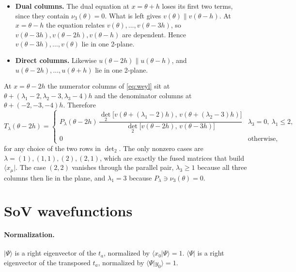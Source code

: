 \documentclass[11pt]{article}
\newcommand{\ket}[1]{|#1\rangle}
\newcommand{\bra}[1]{\langle #1|}
\begin{document}
\begin{itemize}
\item \textbf{Dual columns.} The dual equation at $x=\theta+h$ loses its first two terms, since they contain $\nu_3(\theta)=0$. What is left gives $v(\theta)\parallel v(\theta-h)$. At $x=\theta-h$ the equation relates $v(\theta),\dots,v(\theta-3h)$, so $v(\theta-3h),v(\theta-2h),v(\theta-h)$ are dependent. Hence $v(\theta-3h),\dots,v(\theta)$ lie in one 2-plane.
\item \textbf{Direct columns.} Likewise $u(\theta-2h)\parallel u(\theta-h)$, and $u(\theta-2h),\dots,u(\theta+h)$ lie in one 2-plane.
\end{itemize}
At $x=\theta-2h$ the numerator columns of \eqref{eq:weyl} sit at $\theta+(\lambda_1-2,\lambda_2-3,\lambda_3-4)h$ and the denominator columns at $\theta+(-2,-3,-4)h$. Therefore
\begin{equation}
T_\lambda(\theta-2h)=\begin{cases}P_\lambda(\theta-2h)\,\dfrac{\det_2\big[v(\theta+(\lambda_1-2)h),\,v(\theta+(\lambda_2-3)h)\big]}{\det_2\big[v(\theta-2h),\,v(\theta-3h)\big]} & \lambda_3=0,\ \lambda_1\le2,\\[8pt] 0 & \text{otherwise,}\end{cases}
\end{equation}
for any choice of the two rows in $\det_2$. The only nonzero cases are $\lambda=(1),(1,1),(2),(2,1)$, which are exactly the fused matrices that build $\bra{x_\mu}$. The case $(2,2)$ vanishes through the parallel pair, $\lambda_3\ge1$ because all three columns then lie in the plane, and $\lambda_1=3$ because $P_\lambda\ni\nu_3(\theta)=0$.

\section{SoV wavefunctions}\label{sec:wf}

\paragraph{Normalization.} $\ket{\Psi}$ is a right eigenvector of the $t_a$, normalized by $\langle x_0|\Psi\rangle=1$. $\bra{\Psi}$ is a right eigenvector of the transposed $t_a$, normalized by $\langle\Psi|y_0\rangle=1$.
\end{document}
